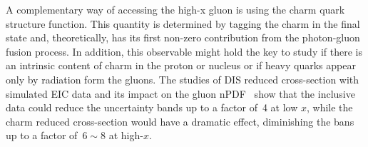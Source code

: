 A complementary way of accessing the high-x gluon is using the charm quark structure function. This quantity is determined by tagging the charm in the final state and, theoretically, has its first non-zero contribution from the photon-gluon fusion process. In addition, this observable might hold the key to study if there is an intrinsic content of charm in the proton or nucleus or if heavy quarks appear only by radiation form the gluons. The studies of DIS reduced cross-section with simulated EIC data and its impact on the gluon nPDF~\cite{PhysRevD.96.114005} show that the inclusive data could reduce the uncertainty bands up to a factor of~4 at low $x$, while the charm reduced cross-section would have a dramatic effect, diminishing the bans up to a factor of~$6\sim 8$ at high-$x$.   





%



